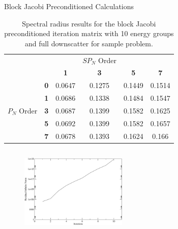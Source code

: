 \documentclass{beamer}
\begin{document}
\begin{frame}{Block Jacobi Preconditioned Calculations}

{\tiny  \begin{table}[h!]
    \begin{center}
      \begin{tabular}{cccccc}\hline\hline
        \multicolumn{1}{c}{}& 
        \multicolumn{1}{c}{}& 
        \multicolumn{1}{c}{}& 
        \multicolumn{1}{c}{$SP_N$ Order}& 
        \multicolumn{1}{c}{}& 
        \multicolumn{1}{c}{} \\
        &   & \textbf{1} & \textbf{3} & \textbf{5} & \textbf{7}  \\
        & \textbf{0} & 0.0647 & 0.1275 & 0.1449 & 0.1514 \\
        & \textbf{1} & 0.0686 & 0.1338 & 0.1484 & 0.1547 \\
        $P_N$ Order & \textbf{3} & 0.0687 & 0.1399 & 0.1582 & 0.1625 \\
        & \textbf{5} & 0.0692 & 0.1399 & 0.1582 & 0.1657 \\
        & \textbf{7} & 0.0678 & 0.1393 & 0.1624 & 0.166 \\
        \hline\hline
      \end{tabular}
    \end{center}
    \caption{Spectral radius results for the block Jacobi
      preconditioned iteration matrix with 10 energy groups and full
      downscatter for sample problem.}
    \label{tab:group10dsbj}
  \end{table}
}

  \begin{columns}

    \begin{column}{0.5\textwidth}

      \begin{figure}[t!]
        \begin{center}
          \includegraphics[width=2.0in]{block_jacobi_res.pdf}
        \end{center}
      \end{figure}


\end{column}
\end{columns}
\end{frame}
\end{document}
